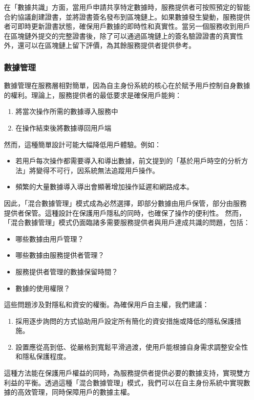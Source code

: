 在「數據共識」方面，當用戶申請共享特定數據時，服務提供者可按照預定的智能合約協議創建證書，並將證書簽名發布到區塊鏈上。如果數據發生變動，服務提供者可即時更新證書狀態，確保用戶數據的即時性和真實性。當另一個服務收到用戶在區塊鏈外提交的完整證書後，除了可以通過區塊鏈上的簽名驗證證書的真實性外，還可以在區塊鏈上留下評價，為其餘服務提供者提供參考。
\subsubsection{數據管理}
數據管理在服務層相對簡單，因為自主身份系統的核心在於賦予用戶控制自身數據的權利。理論上，服務提供者的最低要求是確保用戶能夠：
\begin{enumerate}
  \item 將當次操作所需的數據導入服務中
  \item 在操作結束後將數據導回用戶端
\end{enumerate}
然而，這種簡單設計可能大幅降低用戶體驗。例如：
\begin{itemize}
  \item 若用戶每次操作都需要導入和導出數據，前文提到的「基於用戶時空的分析方法」將變得不可行，因系統無法追蹤用戶操作。
  \item 頻繁的大量數據導入導出會顯著增加操作延遲和網路成本。
\end{itemize}
因此，「混合數據管理」模式成為必然選擇，即部分數據由用戶保管，部分由服務提供者保管。這種設計在保護用戶隱私的同時，也確保了操作的便利性。
然而，「混合數據管理」模式仍面臨諸多需要服務提供者與用戶達成共識的問題，包括：
\begin{itemize}
  \item 哪些數據由用戶管理？
  \item 哪些數據由服務提供者管理？
  \item 服務提供者管理的數據保留時間？
  \item 數據的使用權限？
\end{itemize}
這些問題涉及對隱私和資安的權衡。為確保用戶自主權，我們建議：
\begin{enumerate}
  \item 採用逐步詢問的方式協助用戶設定所有簡化的資安措施或降低的隱私保護措施。
  \item 設置應從高到低、從嚴格到寬鬆平滑過渡，使用戶能根據自身需求調整安全性和隱私保護程度。
\end{enumerate}
這種方法能在保護用戶權益的同時，為服務提供者提供必要的數據支持，實現雙方利益的平衡。透過這種「混合數據管理」模式，我們可以在自主身份系統中實現數據的高效管理，同時保障用戶的數據主權。
